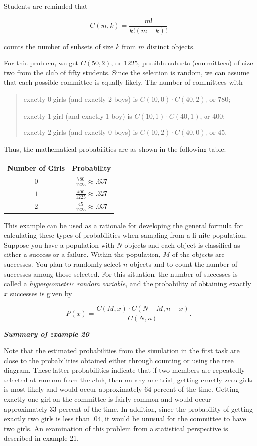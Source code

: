 \documentclass[
  10pt,
  a4paper,
  landscape,
  twoside,
  openany
]{scrbook}
\newcounter{example}
\begin{document}
{Students are reminded that

$$
  C(m,k)=\frac{m!}{k!(m-k)!}
$$

counts the number of subsets of size $k$ from $m$ distinct objects.

For this problem, we get $C(50, 2)$, or $1225$, possible subsets (committees) of size two from the club of fifty students. Since the selection is random, we can assume that each possible committee is equally likely. The number of committees with---

\begin{quote}
  exactly $0$ girls (and exactly $2$ boys) is $C(10, 0) \cdot C(40, 2)$, or $780$;

  exactly $1$ girl (and exactly $1$ boy) is $C(10, 1) \cdot C(40, 1)$, or $400$;

  exactly $2$ girls (and exactly $0$ boys) is $C(10, 2) \cdot C(40, 0)$, or $45$.
\end{quote}

Thus, the mathematical probabilities are as shown in the following table:

\begin{center}
\begin{tabular}{|c|c|}
\hline
Number of Girls & Probability \\
\hline
$0$ & $\frac{780}{1225}\approx .637$ \\
\hline
$1$ & $\frac{400}{1225}\approx .327$ \\
\hline
$2$ & $\frac{45}{1225}\approx .037$ \\
\hline
\end{tabular}
\end{center}

This example can be used as a rationale for developing the general formula for calculating these types of probabilities when sampling from a fi nite population. Suppose you have a population with $N$ objects and each object is classified as either a success or a failure. Within the population, $M$ of the objects are successes. You plan to randomly select $n$ objects and to count the number of successes among those selected. For this situation, the number of successes is called a \emph{hypergeometric random variable}, and the probability of obtaining exactly $x$ successes is given by

$$
  P(x)=\frac{C(M,x)\cdot C(N-M,n-x)}{C(N,n)}.
$$

\noindent
\textbf{\emph{Summary of example 20}}

Note that the estimated probabilities from the simulation in the first task are close to the probabilities obtained either through counting or using the tree diagram. These latter probabilities indicate that if two members are repeatedly selected at random from the club, then on any one trial, getting exactly zero girls is most likely and would occur approximately $64$ percent of the time. Getting exactly one girl on the committee is fairly common and would occur approximately $33$ percent of the time. In addition, since the probability of getting exactly two girls is less than $.04$, it would be unusual for the committee to have two girls. An examination of this problem from a statistical perspective is described in example 21.

}
\end{document}
